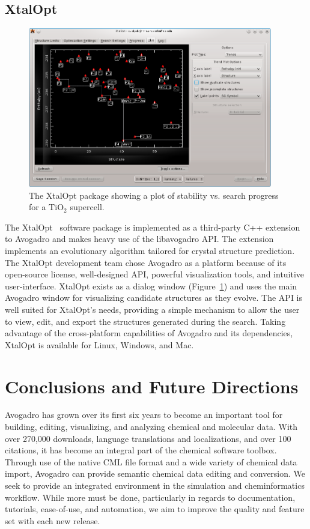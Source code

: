 \documentclass[10pt]{bmc_article}
\newenvironment{bmcformat}{\begin{raggedright}
\baselineskip20pt\sloppy\setboolean{publ}{false}}{\end{raggedright}
\baselineskip20pt\sloppy}
\begin{document}
\begin{bmcformat}
\subsection{XtalOpt}

\begin{figure}
  \includegraphics[width=0.95\textwidth]{images/xtalopt}
  \caption{The XtalOpt package showing a plot of stability vs. search progress
    for a $\mathrm{TiO_2}$ supercell.}
  \label{f:xtalopt}
\end{figure}

The XtalOpt~\cite{xo1, xo2} software package is implemented as a third-party C++
extension to Avogadro and makes heavy use of the libavogadro API. The extension
implements an evolutionary algorithm tailored for crystal structure prediction.
The XtalOpt development team chose Avogadro as a platform because of its
open-source license, well-designed API, powerful visualization tools, and
intuitive user-interface. XtalOpt exists as a dialog window
(Figure~\ref{f:xtalopt}) and uses the main Avogadro window for visualizing
candidate structures as they evolve. The API is well suited for XtalOpt’s needs,
providing a simple mechanism to allow the user to view, edit, and export the
structures generated during the search. Taking advantage of the cross-platform
capabilities of Avogadro and its dependencies, XtalOpt is available for Linux,
Windows, and Mac.

\section{Conclusions and Future Directions}

Avogadro has grown over its first six years to become an important
tool for building, editing, visualizing, and analyzing chemical and
molecular data. With over 270,000 downloads,
language translations and localizations, and over 100 citations, it
has become an integral part of the chemical software toolbox. Through
use of the native CML file format and a wide variety of chemical data
import, Avogadro can provide semantic chemical data editing and conversion.
We seek to provide an integrated environment in the simulation and
cheminformatics workflow. While more must be done, particularly in
regards to documentation, tutorials, ease-of-use, and automation, we
aim to improve the quality and feature set with each new release.


\end{bmcformat}
\end{document}
